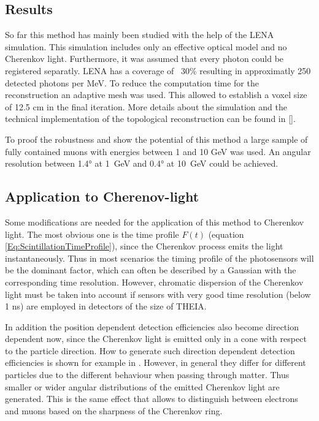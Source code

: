   \subsection*{Results}
  
  So far this method has mainly been studied with the help of the LENA simulation. This simulation includes only an effective optical model and 
  no Cherenkov light. Furthermore, it was assumed that every photon could be registered separatly. LENA has a coverage of ~30\% resulting in 
  approximatly 250 detected photons per MeV. To reduce the computation time for the reconstruction an adaptive mesh was used. This allowed to 
  establish a voxel size of 12.5 cm in the final iteration. More details about the simulation and the technical implementation of the topological
  reconstruction can be found in \ref{}.
  
  To proof the robustness and show the potential of this method a large sample of fully contained muons with energies between 1 and 10 GeV was 
  used. An angular resolution between 1.4° at 1~GeV and 0.4° at 10~GeV could be achieved. 
  
  
  
  
  \subsection*{Application to Cherenov-light}
  
  Some modifications are needed for the application of this method to Cherenkov light. The most obvious one is the 
  time profile $F(t)$ (equation \ref{Eq:ScintillationTimeProfile}), since the Cherenkov process emits 
  the light instantaneously. Thus in most scenarios the timing profile of the photosensors will be the dominant
  factor, which can often be described by a Gaussian with the corresponding time resolution. However, chromatic 
  dispersion of the Cherenkov light must be taken into account if sensors with very good time resolution 
  (below 1 ns) are employed in detectors of the size of THEIA. 
  
  In addition the position dependent detection efficiencies also become direction dependent now, since the Cherenkov 
  light is emitted only in a cone with respect to the particle direction. How to generate such direction dependent
  detection efficiencies is shown for example in \cite{}. However, in general they differ for different particles
  due to the different behaviour when passing through matter. Thus smaller or wider angular distributions of the emitted
  Cherenkov light are generated. This is the same effect that allows to distinguish between electrons and muons 
  based on the sharpness of the Cherenkov ring.
  
